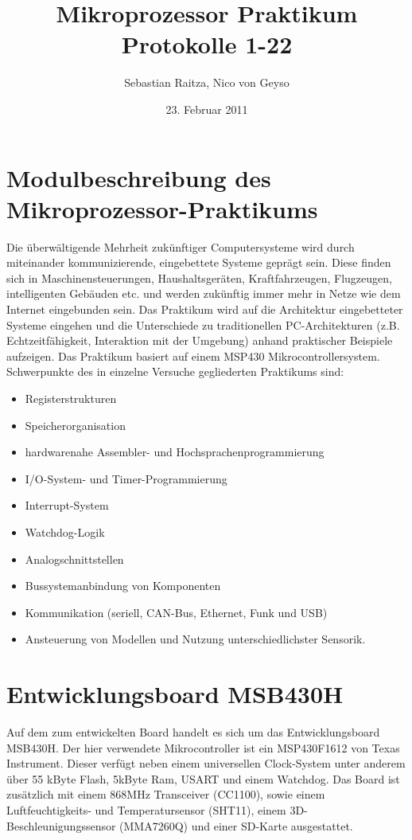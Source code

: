 \documentclass[11pt,german]{scrartcl}
\title{Mikroprozessor Praktikum\\Protokolle 1-22}
\author{Sebastian Raitza, Nico von Geyso}
\date{23. Februar 2011}
\begin{document}
\maketitle

\tableofcontents

\section{Modulbeschreibung des Mikroprozessor-Praktikums}

Die überwältigende Mehrheit zukünftiger Computersysteme wird durch miteinander kommunizierende, eingebettete Systeme geprägt sein.
Diese finden sich in Maschinensteuerungen, Haushaltsgeräten, Kraftfahrzeugen, Flugzeugen, intelligenten Gebäuden etc. und
werden zukünftig immer mehr in Netze wie dem Internet eingebunden sein.
Das Praktikum wird auf die Architektur eingebetteter Systeme eingehen und die Unterschiede zu traditionellen PC-Architekturen
(z.B. Echtzeitfähigkeit, Interaktion mit der Umgebung) anhand praktischer Beispiele aufzeigen.
Das Praktikum basiert auf einem MSP430 Mikrocontrollersystem.
Schwerpunkte des in einzelne Versuche gegliederten Praktikums sind:
\begin{itemize}
    \item Registerstrukturen
    \item Speicherorganisation
    \item hardwarenahe Assembler- und Hochsprachenprogrammierung
    \item I/O-System- und Timer-Programmierung
    \item Interrupt-System
    \item Watchdog-Logik
    \item Analogschnittstellen
    \item Bussystemanbindung von Komponenten
    \item Kommunikation (seriell, CAN-Bus, Ethernet, Funk und USB)
    \item Ansteuerung von Modellen und Nutzung unterschiedlichster Sensorik.
\end{itemize}


\section{Entwicklungsboard MSB430H}
Auf dem zum entwickelten Board handelt es sich um das Entwicklungsboard MSB430H.
Der hier verwendete Mikrocontroller ist ein MSP430F1612 von Texas Instrument.
Dieser verfügt neben einem universellen Clock-System unter anderem über 55 kByte Flash, 5kByte Ram, USART und einem Watchdog.
Das Board ist zusätzlich mit einem 868MHz Transceiver (CC1100),
sowie einem Luftfeuchtigkeits- und Temperatursensor (SHT11), einem 3D-Beschleunigungssensor (MMA7260Q)
und einer SD-Karte ausgestattet.
\end{document}
